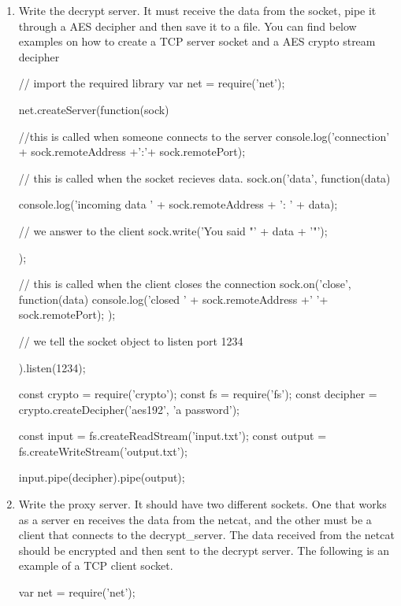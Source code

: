 \begin{Exercise}[label={proxy}]
\begin{enumerate}
	\item Write the decrypt server. It must receive the data from the socket, pipe it through a AES decipher and then save it to a file. You can find below examples on how to create a TCP server socket and a AES crypto stream decipher
   
   \begin{js}
     // import the required library
     var net = require('net');
     
     net.createServer(function(sock) {
       //this is called when someone connects to the server
       console.log('connection' + sock.remoteAddress +':'+ sock.remotePort);
       
       // this is called when the socket recieves data.
       sock.on('data', function(data) {
         console.log('incoming data ' + sock.remoteAddress + ': ' + data);
         
         // we answer to the client
         sock.write('You said "' + data + '"');
       });
       
       // this is called when the client closes the connection
       sock.on('close', function(data) {
         console.log('closed ' + sock.remoteAddress +' '+ sock.remotePort);
       });
       
       // we tell the socket object to listen port 1234
     }).listen(1234);
   \end{js}
 
 \begin{js}
   const crypto = require('crypto');
   const fs = require('fs');
   const decipher = crypto.createDecipher('aes192', 'a password');
   
   const input = fs.createReadStream('input.txt');
   const output = fs.createWriteStream('output.txt');
   
   input.pipe(decipher).pipe(output);
 \end{js}

	\item Write the proxy server. It should have two different sockets. One that works as a server en receives the data from the netcat, and the other must be a client that connects to the decrypt\_server. The data received from the netcat should be encrypted and then sent to the decrypt server. The following is an example of a TCP client socket.
  
  \begin{js}
    var net = require('net');
    

\end{js}
\end{enumerate}
\end{Exercise}
